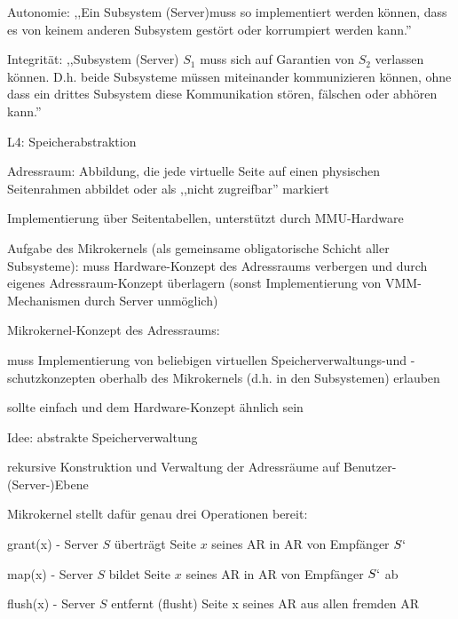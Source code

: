 \documentclass[a4paper]{article}
\begin{document}
\begin{multicols}{3}
    \begin{enumerate*}
        \item
        Autonomie: ,,Ein Subsystem (Server)muss so implementiert werden
        können, dass es von keinem anderen Subsystem gestört oder korrumpiert
        werden kann.''
        \item
        Integrität: ,,Subsystem (Server) $S_1$ muss sich auf Garantien von
        $S_2$ verlassen können. D.h. beide Subsysteme müssen miteinander
        kommunizieren können, ohne dass ein drittes Subsystem diese
        Kommunikation stören, fälschen oder abhören kann.''
    \end{enumerate*}

    L4: Speicherabstraktion

    \begin{itemize*}
        \item
        Adressraum: Abbildung, die jede virtuelle Seite auf einen physischen
        Seitenrahmen abbildet oder als ,,nicht zugreifbar'' markiert
        \item
        Implementierung über Seitentabellen, unterstützt durch MMU-Hardware
        \item
        Aufgabe des Mikrokernels (als gemeinsame obligatorische Schicht aller
        Subsysteme): muss Hardware-Konzept des Adressraums verbergen und durch
        eigenes Adressraum-Konzept überlagern (sonst Implementierung von
        VMM-Mechanismen durch Server unmöglich)
        \item
        Mikrokernel-Konzept des Adressraums:
        \begin{itemize*}
            \item muss Implementierung von beliebigen virtuellen Speicherverwaltungs-und -schutzkonzepten oberhalb des Mikrokernels (d.h. in den Subsystemen) erlauben
            \item sollte einfach und dem Hardware-Konzept ähnlich sein
        \end{itemize*}
        \item
        Idee: abstrakte Speicherverwaltung
        \begin{itemize*}
            \item rekursive Konstruktion und Verwaltung der Adressräume auf Benutzer-(Server-)Ebene
            \item Mikrokernel stellt dafür genau drei Operationen bereit: \begin{enumerate*} \item grant(x) - Server $S$ überträgt Seite $x$ seines AR in AR von Empfänger $S`$ \item map(x) - Server $S$ bildet Seite $x$ seines AR in AR von Empfänger $S`$ ab \item flush(x) - Server $S$ entfernt (flusht) Seite x seines AR aus allen fremden AR \end{enumerate*}
        \end{itemize*}
    \end{itemize*}


\end{multicols}
\end{document}
